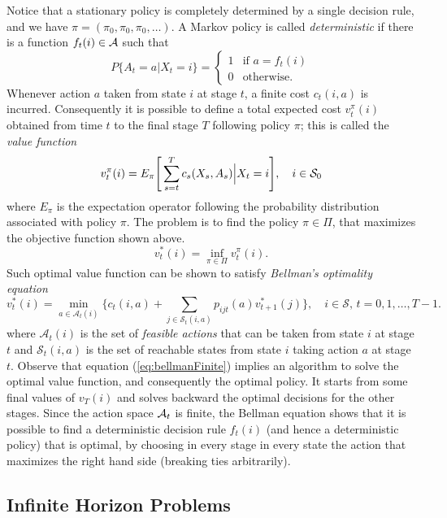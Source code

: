 \documentclass[11pt]{article}
\newcommand {\cA}{\ensuremath \mathcal{A}}
\newcommand {\cS}{\ensuremath \mathcal{S}}
\begin{document}
Notice that a stationary policy is completely determined by a single decision rule, and we have $\pi=(\pi_0,\pi_0,\pi_0,\ldots)$. A Markov policy is called \emph{deterministic} if there is a function $f_t(i)\in\cA$ such that
\[  P\{A_t=a|X_t=i\}=
\begin{cases}
  1 & \text{if } a=f_t(i)\\
  0 & \text{otherwise.}
\end{cases}\]
Whenever action $a$ taken from state $i$ at stage $t$, a finite cost $c_t(i,a)$ is incurred. 
Consequently it is possible to define a total expected cost  $v_t^{\pi}(i)$ obtained from time $t$ to the final stage $T$ following policy $\pi$; this is called the \emph{value function}
\begin{equation}
v_t^{\pi}(i)=E_{\pi}\Bigg[\sum_{s=t}^T c_s(X_s,A_s)\Big|X_t=i\Bigg],\quad i\in \cS_0
\label{eq:finite}
\end{equation}
where $E_{\pi}$ is the expectation operator following the probability distribution associated with policy $\pi$. The problem is to find the policy $\pi \in \Pi$,  that maximizes the objective function shown above.
\[v_t^*(i) = \inf_{\pi \in \Pi} v_t^\pi(i).\]
Such optimal value function can be shown to satisfy \emph{Bellman's optimality equation}
\begin{equation}\label{eq:bellmanFinite}
  v_t^*(i) = \min_{a \in \mathcal{A}_t(i)} \Bigg \{ c_t(i,a) + \sum_{j \in \mathcal{S}_t(i,a)} p_{ijt}(a)v^*_{t+1}(j) \Bigg \} ,\quad i \in \mathcal{S},\, t=0,1,\ldots,T-1.
\end{equation}
where $\mathcal{A}_t(i)$ is the set of \emph{feasible actions} that can be taken from state $i$ at stage $t$ and $\mathcal{S}_t(i,a)$ is the set of reachable states from state $i$ taking action $a$ at stage $t$. Observe that equation (\ref{eq:bellmanFinite}) implies an algorithm to solve the optimal value function, and consequently the optimal policy. It starts from some final values of $v_T(i)$ and solves backward the optimal decisions for the other stages. Since the action space $\cA_t$ is finite, the Bellman equation shows that it is possible to find a deterministic decision rule $f_t(i)$ (and hence a deterministic policy) that is optimal, by choosing in every stage in every state the action that maximizes the right hand side (breaking ties arbitrarily).


\subsection{Infinite Horizon Problems}
\end{document}
